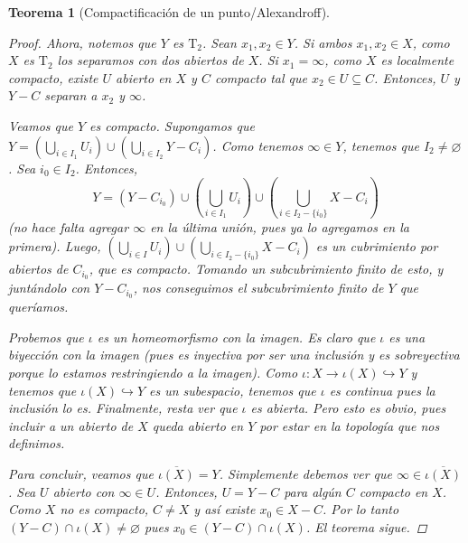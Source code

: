 \documentclass[12pt]{book}
\newtheorem{teo}{Teorema}[section]
\theoremstyle{definition}
\let\emptyset\varnothing
\begin{document}
\begin{teo}[Compactificación de un punto/Alexandroff]
\begin{proof}
Ahora, notemos que $Y$ es $\mathrm{T}_2$. Sean $x_1,x_2\in Y$. Si ambos $x_1,x_2\in X$, como $X$ es $\mathrm{T}_2$ los separamos con dos abiertos de $X$. Si $x_1=\infty$, como $X$ es localmente compacto, existe $U$ abierto en $X$ y $C$ compacto tal que $x_2\in U\subseteq C$. Entonces, $U$ y $Y-C$ separan a $x_2$ y $\infty$.

Veamos que $Y$ es compacto. Supongamos que $Y=\left(\displaystyle\bigcup_{i\in I_1}U_i\right)\cup \left( \displaystyle\bigcup_{i\in I_2}Y-C_i\right)$. Como tenemos $\infty\in Y$, tenemos que $I_2\neq\emptyset$. Sea $i_0\in I_2$. Entonces, $$Y = (Y-C_{i_0})\cup \left(\displaystyle\bigcup_{i\in I_1}U_i\right)\cup \left(\bigcup_{i\in I_2 - \{i_0\}} X-C_i\right)$$ (no hace falta agregar $\infty$ en la última unión, pues ya lo agregamos en la primera). Luego, $\left(\displaystyle\bigcup_{i\in I}U_i\right)\cup \left(\displaystyle\bigcup_{i\in I_2 - \{i_0\}} X-C_i\right)$ es un cubrimiento por abiertos de $C_{i_0}$, que es compacto. Tomando un subcubrimiento finito de esto, y juntándolo con $Y-C_{i_0}$, nos conseguimos el subcubrimiento finito de $Y$ que queríamos.

Probemos que $\iota$ es un homeomorfismo con la imagen. Es claro que $\iota$ es una biyección con la imagen (pues es inyectiva por ser una inclusión y es sobreyectiva porque lo estamos restringiendo a la imagen). Como $\iota:X\to \iota(X)\hookrightarrow Y$ y tenemos que $\iota(X)\hookrightarrow Y$ es un subespacio, tenemos que $\iota$ es continua pues la inclusión lo es. Finalmente, resta ver que $\iota$ es abierta. Pero esto es obvio, pues incluir a un abierto de $X$ queda abierto en $Y$ por estar en la topología que nos definimos.

Para concluir, veamos que $\overline{\iota(X)}=Y$. Simplemente debemos ver que $\infty\in\overline{\iota(X)}$. Sea $U$ abierto con $\infty\in U$. Entonces, $U = Y-C$ para algún $C$ compacto en $X$. Como $X$ no es compacto, $C\neq X$ y así existe $x_0\in X-C$. Por lo tanto $(Y-C)\cap \iota(X) \neq\emptyset$ pues $x_0\in (Y-C)\cap\iota(X)$. El teorema sigue.
\end{proof}
\end{teo}
\end{document}
